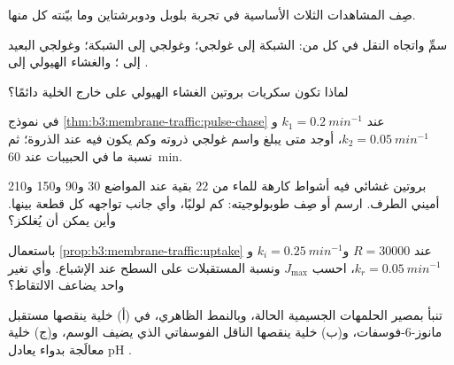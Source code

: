 \begin{exercise}[$\star$]\label{exo:b3:membrane-traffic:2}
صِف المشاهدات الثلاث الأساسية في تجربة بلوبل ودوبرشتاين
وما بيّنته كل منها.
\end{exercise}

\begin{exercise}[$\star$]\label{exo:b3:membrane-traffic:3}
سمِّ  واتجاه النقل في كل من: الشبكة إلى غولجي؛
وغولجي إلى الشبكة؛ وغولجي البعيد إلى ؛ والغشاء الهيولي إلى
.
\end{exercise}

\begin{exercise}[$\star$]\label{exo:b3:membrane-traffic:4}
لماذا تكون سكريات بروتين الغشاء الهيولي على خارج
الخلية دائمًا؟
\end{exercise}

\begin{exercise}[$\star\star$]\label{exo:b3:membrane-traffic:5}
في نموذج \cref{thm:b3:membrane-traffic:pulse-chase} عند $k_{1}
= \qty{0.2}{min^{-1}}$ و$k_{2} = \qty{0.05}{min^{-1}}$، أوجد متى
يبلغ واسم غولجي ذروته وكم يكون فيه عند الذروة؛ ثم
نسبة ما في الحبيبات عند \qty{60}{min}.
\end{exercise}

\begin{exercise}[$\star\star$]\label{exo:b3:membrane-traffic:6}
بروتين غشائي فيه أشواط كارهة للماء من $22$ بقية عند
المواضع 30 و90 و150 و210  أميني الطرف.
ارسم أو صِف طوبولوجيته: كم لولبًا، وأي جانب تواجهه كل قطعة
بينها. وأين يمكن أن يُغلكز؟
\end{exercise}

\begin{exercise}[$\star\star$]\label{exo:b3:membrane-traffic:7}
باستعمال \cref{prop:b3:membrane-traffic:uptake} عند $R = \num{30000}$
و$k_{i} = \qty{0.25}{min^{-1}}$ و$k_{r} = \qty{0.05}{min^{-1}}$، احسب
$J_{\max}$ ونسبة المستقبلات على السطح عند الإشباع.
وأي تغير واحد يضاعف الالتقاط؟
\end{exercise}

\begin{exercise}[$\star\star$]\label{exo:b3:membrane-traffic:8}
تنبأ بمصير الحلمهات الجسيمية الحالة، وبالنمط الظاهري، في (أ)
خلية ينقصها مستقبل مانوز-6-فوسفات، و(ب) خلية ينقصها
الناقل الفوسفاتي الذي يضيف الوسم، و(ج) خلية معالَجة
بدواء يعادل pH .
\end{exercise}

